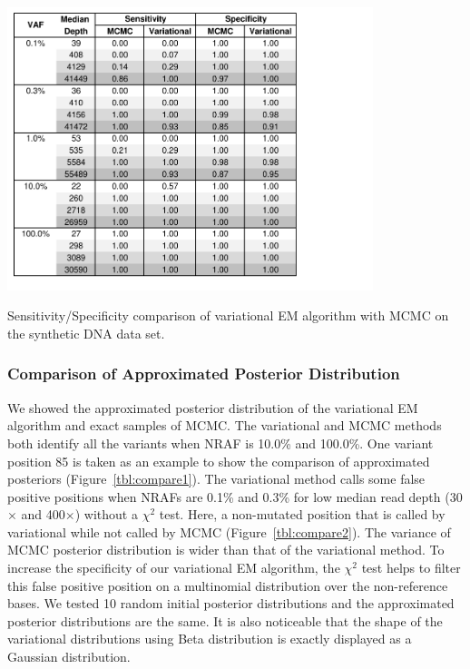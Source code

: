 \documentclass[11pt,reqno]{amsart}
\begin{document}
\begin{table}[h]
\centering
\includegraphics[width=0.8\textwidth]{tables/statistics_mcmc_var.pdf}
\caption{Sensitivity/Specificity comparison of variational EM algorithm with MCMC on the synthetic DNA data set.}
\label{tbl:statistics_mcmc_var}
\end{table}

\subsubsection{Comparison of Approximated Posterior Distribution}
We showed the approximated posterior distribution of the variational EM algorithm and exact samples of MCMC.
The variational and MCMC methods both identify all the variants when NRAF is 10.0\% and 100.0\%.
One variant position 85 is taken as an example to show the comparison of approximated posteriors (Figure~\ref{tbl:compare1}).
The variational method calls some false positive positions when NRAFs are 0.1\% and 0.3\% for low median read depth (30$\times$ and 400$\times$) without a $\chi^2$ test.
Here, a non-mutated position that is called by variational while not called by MCMC (Figure~\ref{tbl:compare2}).
The variance of MCMC posterior distribution is wider than that of the variational method. %
To increase the specificity of our variational EM algorithm, the $\chi^2$ test helps to filter this false positive position on a multinomial distribution over the non-reference bases.
We tested 10 random initial posterior distributions and the approximated posterior distributions are the same.
It is also noticeable that the shape of the variational distributions using Beta distribution is exactly displayed as a Gaussian distribution.
\end{document}

